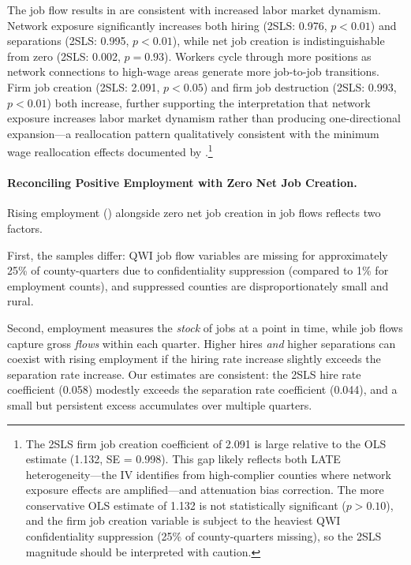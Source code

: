 \documentclass[12pt]{article}
\begin{document}
The job flow results in  are consistent with increased labor market dynamism. Network exposure significantly increases both hiring (2SLS: 0.976, $p < 0.01$) and separations (2SLS: 0.995, $p < 0.01$), while net job creation is indistinguishable from zero (2SLS: 0.002, $p = 0.93$). Workers cycle through more positions as network connections to high-wage areas generate more job-to-job transitions. Firm job creation (2SLS: 2.091, $p < 0.05$) and firm job destruction (2SLS: 0.993, $p < 0.01$) both increase, further supporting the interpretation that network exposure increases labor market dynamism rather than producing one-directional expansion---a reallocation pattern qualitatively consistent with the minimum wage reallocation effects documented by \citet{dustmann2022}.\footnote{The 2SLS firm job creation coefficient of 2.091 is large relative to the OLS estimate (1.132, SE = 0.998). This gap likely reflects both LATE heterogeneity---the IV identifies from high-complier counties where network exposure effects are amplified---and attenuation bias correction. The more conservative OLS estimate of 1.132 is not statistically significant ($p > 0.10$), and the firm job creation variable is subject to the heaviest QWI confidentiality suppression (25\% of county-quarters missing), so the 2SLS magnitude should be interpreted with caution.}

\paragraph{Reconciling Positive Employment with Zero Net Job Creation.} Rising employment () alongside zero net job creation in job flows reflects two factors.

First, the samples differ: QWI job flow variables are missing for approximately 25\% of county-quarters due to confidentiality suppression (compared to 1\% for employment counts), and suppressed counties are disproportionately small and rural.

Second, employment measures the \textit{stock} of jobs at a point in time, while job flows capture gross \textit{flows} within each quarter. Higher hires \textit{and} higher separations can coexist with rising employment if the hiring rate increase slightly exceeds the separation rate increase. Our estimates are consistent: the 2SLS hire rate coefficient (0.058) modestly exceeds the separation rate coefficient (0.044), and a small but persistent excess accumulates over multiple quarters.
\end{document}
